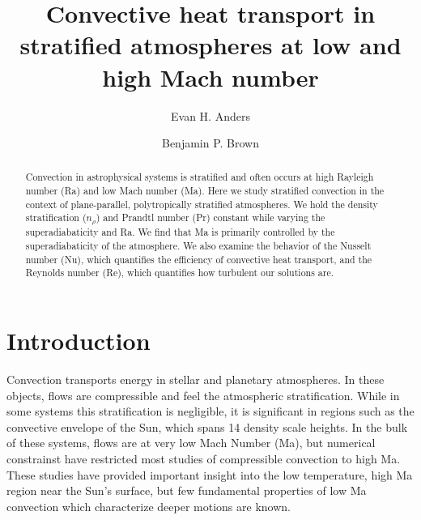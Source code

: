 \documentclass[aps, prl, twocolumn, nofootinbib, groupedaddress, amsfonts, amssymb, amsmath]{revtex4-1}
\newcommand{\RB}{Rayleigh-B\'{e}nard }
\begin{document}
\author{Evan H. Anders}
\author{Benjamin P. Brown}
\title{Convective heat transport in stratified atmospheres at low and high Mach number}

\begin{abstract}
Convection in astrophysical systems is stratified and
often occurs at high Rayleigh number (Ra) and low
Mach number (Ma).
Here we study stratified convection in the context of 
plane-parallel, polytropically stratified atmospheres. 
We hold the density stratification ($n_{\rho}$) and Prandtl 
number (Pr) constant while varying the superadiabaticity
and Ra.  We find that Ma is primarily controlled by the
superadiabaticity of the atmosphere.  We also examine
the behavior of the Nusselt number (Nu), 
which quantifies the efficiency of convective heat transport,
and the Reynolds number (Re), which quantifies how turbulent our
solutions are.
\end{abstract}
\maketitle


\section{Introduction}
\label{sec:intro}
Convection transports energy in stellar and planetary atmospheres.
In these objects, flows are compressible and
feel the atmospheric stratification.  While in some systems this stratification is
negligible, it is significant in regions such as
the convective envelope of the Sun, which spans 14 density scale heights.
In the bulk of these systems, flows are at very low Mach Number (Ma), but numerical
constrainst have restricted most studies of compressible convection to high Ma.
These studies have provided important insight into the low temperature, high Ma region
near the Sun's surface, but few fundamental
properties of low Ma convection which characterize deeper motions
are known.
\end{document}
